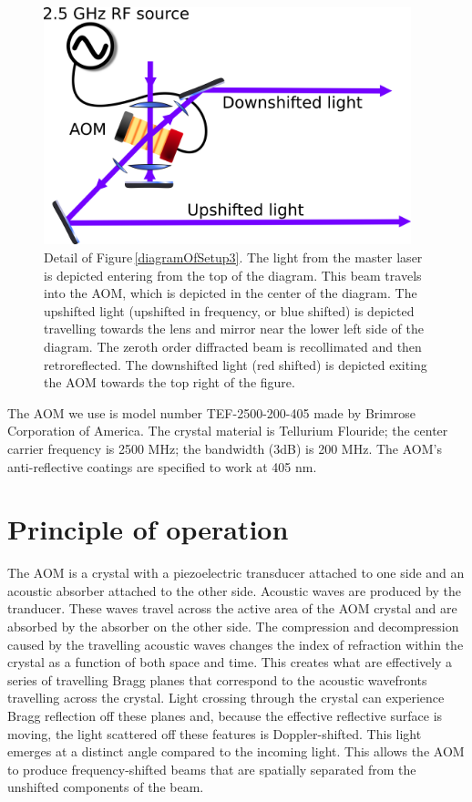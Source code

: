 \begin{figure}
\centerline{
\includegraphics[width=0.95\textwidth]{diagramOfAOM}}
\caption[AOM diagram]{\label{aomDiagramDetail} Detail of Figure\,\ref{diagramOfSetup3}. The light from the master laser is depicted entering from the top of the diagram. This beam travels into the AOM, which is depicted in the center of the diagram. The upshifted light (upshifted in frequency, or blue shifted) is depicted travelling towards the lens and mirror near the lower left side of the diagram. The zeroth order diffracted beam is recollimated and then retroreflected. The downshifted light (red shifted) is depicted exiting the AOM towards the top right of the figure.}
\end{figure}

The AOM we use is model number TEF-2500-200-405 made by Brimrose Corporation of America. The crystal material is Tellurium Flouride; the center carrier frequency is 2500 MHz; the bandwidth (3dB) is 200 MHz. The AOM's anti-reflective coatings are specified to work at 405 nm. 
\section{Principle of operation}

The AOM is a crystal with a piezoelectric transducer attached to one side and an acoustic absorber attached to the other side. Acoustic waves are produced by the tranducer. These waves travel across the active area of the AOM crystal and are absorbed by the absorber on the other side. The compression and decompression caused by the travelling acoustic waves changes the index of refraction within the crystal as a function of both space and time. This creates what are effectively a series of travelling Bragg planes that correspond to the acoustic wavefronts travelling across the crystal. Light crossing through the crystal can experience Bragg reflection off these planes and, because the effective reflective surface is moving, the light scattered off these features is Doppler-shifted. This light emerges at a distinct angle compared to the incoming light. This allows the AOM to produce frequency-shifted beams that are spatially separated from the unshifted components of the beam.

